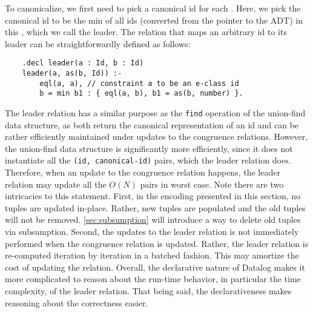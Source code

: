 To canonicalize, we first need to pick a canonical id for each \eclass.
Here, we pick the canonical id to be the min of all ids (converted from the pointer to the ADT) 
 in this \eclass,
 which we call the leader. 
The relation that maps an arbitrary id to its leader can be straightforwardly defined
 as follows:
\begin{verbatim}
    .decl leader(a : Id, b : Id)
    leader(a, as(b, Id)) :- 
        eql(a, a), // constraint a to be an e-class id
        b = min b1 : { eql(a, b), b1 = as(b, number) }.
\end{verbatim}

The leader relation has a similar purpose 
 as the \verb|find| operation of 
 the union-find data structure,
 as both return the canonical representation of an \eclass id
 and can be rather efficiently maintained 
 under updates to the congruence relations.
However, 
 the union-find data structure is significantly more efficiently,
 since it does not instantiate all the \verb|(id, canonical-id)|
 pairs, which the leader relation does.
Therefore,
 when an update to the congruence relation happens,
 the leader relation may update all the $O(N)$ pairs
 in worst case.
Note
 there are two intricacies to this statement.
First, in the encoding presented in this section,
 no tuples are updated in-place.
Rather, new tuples are populated and
 the old tuples will not be removed.
\autoref{sec:subsumption} will introduce a way 
 to delete old tuples via subsumption.
Second, the updates to the leader relation 
 is not immediately performed 
 when the congruence relation is updated.
Rather,
 the leader relation is re-computed iteration by iteration
 in a batched fashion.
This may amortize the cost of updating the relation.
Overall,
 the declarative nature of Datalog makes it more complicated
 to reason about the run-time behavior, 
 in particular the time complexity, of the leader relation.
That being said,
 the declarativeness makes reasoning about the correctness easier.

